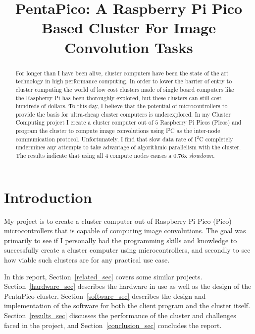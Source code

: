 \documentclass[conference]{IEEEtran}
\begin{document}
\title{PentaPico: A Raspberry Pi Pico Based Cluster For Image Convolution Tasks}

\author{
}

\maketitle

\begin{abstract}
For longer than I have been alive, cluster computers have been the state of the art technology in high performance computing. 
In order to lower the barrier of entry to cluster computing the world of low cost clusters made of single board computers like the Raspberry Pi has been thoroughly explored, but these clusters can still cost hundreds of dollars.
To this day, I believe that the potential of microcontrollers to provide the basis for ultra-cheap cluster computers is underexplored.
In my Cluster Computing project I create a cluster computer out of $5$ Raspberry Pi Picos (Picos) and program the cluster to compute image convolutions using I$^2$C as the inter-node communication protocol.
Unfortunately, I find that slow data rate of I$^2$C completely undermines any attempts to take advantage of algorithmic parallelism with the cluster. 
The results indicate that using all $4$ compute nodes causes a $0.76$x \textit{slowdown}.
\end{abstract}

\section{Introduction}

My project is to create a cluster computer out of Raspberry Pi Pico (Pico) microcontrollers that is capable of computing image convolutions. 
The goal was primarily to see if I personally had the programming skills and knowledge to successfully create a cluster computer using microcontrollers, and secondly to see how viable such clusters are for any practical use case.

In this report, Section~\ref{related_sec} covers some similar projects.
Section~\ref{hardware_sec} describes the hardware in use as well as the design of the PentaPico cluster.
Section~\ref{software_sec} describes the design and implementation of the software for both the client program and the cluster itself.
Section~\ref{results_sec} discusses the performance of the cluster and challenges faced in the project, and Section~\ref{conclusion_sec} concludes the report.
\end{document}
